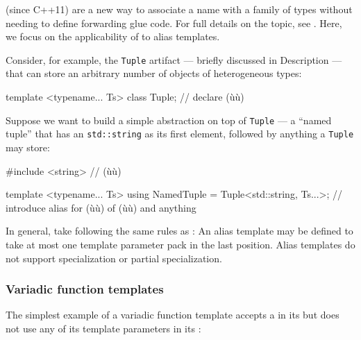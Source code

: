  (since C++11) are a new way to associate a name
with a family of types without needing to define forwarding glue code.
For full details on the topic, see . Here,
we focus on the applicability of  to
alias templates.

Consider, for example, the \lstinline!Tuple! artifact --- briefly discussed
in {Description} --- that can store an arbitrary number of objects of
heterogeneous types:

\begin{emcppslisting}
template <typename... Ts> class Tuple;  // declare (ù{}ù)
\end{emcppslisting}
    

\noindent Suppose we want to build a simple abstraction on top of \lstinline!Tuple!
--- a ``named tuple'' that has an \lstinline!std::string! as its first
element, followed by anything a \lstinline!Tuple! may store:

\begin{emcppslisting}
#include <string>  // (ù{}ù)

template <typename... Ts>
using NamedTuple = Tuple<std::string, Ts...>;
    // introduce alias for (ù{}ù) of (ù{}ù) and anything
\end{emcppslisting}
    

\noindent In general,  take  following the same rules as : An alias template may be defined to take at most one
template parameter pack in the last position. Alias templates do not
support specialization or partial specialization.

\subsubsection[Variadic function templates]{Variadic function templates}\label{variadic-function-templates}

The simplest example of a variadic function template accepts a
 in its  but does not use any of its template parameters in its
:

